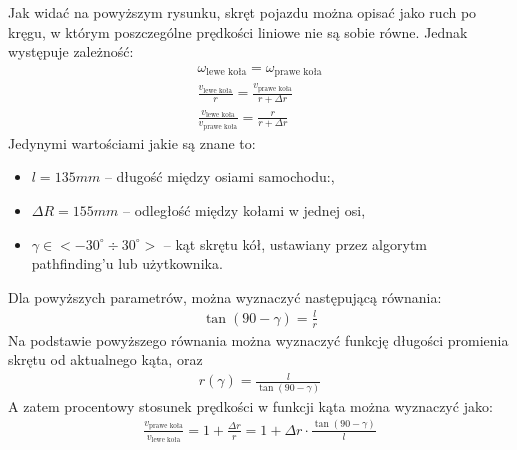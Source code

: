         Jak widać na powyższym rysunku, skręt pojazdu można opisać jako ruch po kręgu, w którym poszczególne prędkości liniowe nie są sobie równe.
        Jednak występuje zależność:
        \begin{gather}
            \omega_{\text{lewe koła}} = \omega_{\text{prawe koła}}\\
            \frac{v_{\text{lewe koła}}}{r} = \frac{v_{\text{prawe koła}}}{r + \Delta r}\\
            \frac{v_\text{lewe koła}}{v_{\text{prawe koła}}} = \frac{r}{r + \Delta r}
        \end{gather}
        Jedynymi wartościami jakie są znane to:
        \begin{itemize}
            \item $l = 135mm$ -- długość między osiami samochodu:,
            \item $\Delta R = 155mm$ -- odległość między kołami w jednej osi,
            \item $\gamma \in <-30^\circ \div 30^\circ>$ -- kąt skrętu kół, ustawiany przez algorytm pathfinding'u lub użytkownika.
        \end{itemize}
        Dla powyższych parametrów, można wyznaczyć następującą równania:
        \begin{gather}
            \tan \left(90 - \gamma\right) = \frac{l}{r}
        \end{gather}
        Na podstawie powyższego równania można wyznaczyć funkcję długości promienia skrętu od aktualnego kąta, oraz 
        \begin{gather}
            r(\gamma) = \frac{l}{\tan(90-\gamma)}
        \end{gather}
        A zatem procentowy stosunek prędkości w funkcji kąta można wyznaczyć jako:
        \begin{gather}
            \frac{v_{\text{prawe koła}}}{v_{\text{lewe koła}}} = 1 + \frac{\Delta r}{r} = 1 + \Delta r \cdot \frac{\tan(90 - \gamma)}{l}
        \end{gather}

